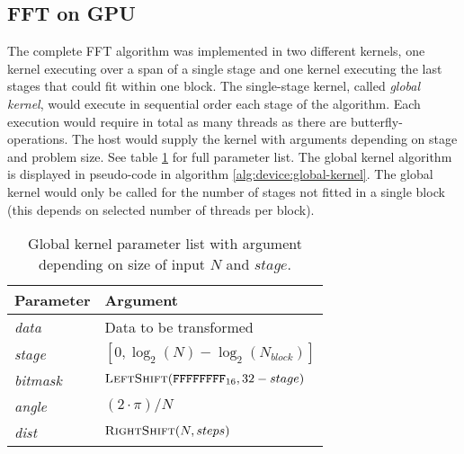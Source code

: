 \subsection{FFT on GPU}

The complete FFT algorithm was implemented in two different kernels, one kernel executing over a span of a single stage and one kernel executing the last stages that could fit within one block. The single-stage kernel, called \textit{global kernel}, would execute in sequential order each stage of the algorithm. Each execution would require in total as many threads as there are butterfly-operations. The host would supply the kernel with arguments depending on stage and problem size. See table \ref{tab:global-kernel} for full parameter list. The global kernel algorithm is displayed in pseudo-code in algorithm \ref{alg:device:global-kernel}. The global kernel would only be called for the number of stages not fitted in a single block (this depends on selected number of threads per block).

\begin{table}
	\centering
	\begin{tabular}{|l|l|}
		\hline
		Parameter & Argument \\ \hline
		\textit{data} & Data to be transformed \\ \hline
		\textit{stage} & $[0,\log_{2}(N) - \log_{2}(N_{block})]$ \\ \hline
		\textit{bitmask} & $\Call{LeftShift}{\texttt{FFFFFFFF}_{16}, 32 - stage}$ \\ \hline
		\textit{angle} & $(2 \cdot \pi)/N$ \\ \hline
		\textit{dist} & $\Call{RightShift}{N, steps}$ \\ \hline		
	\end{tabular}
	\caption{Global kernel parameter list with argument depending on size of input $N$ and $stage$.}
	\label{tab:global-kernel}
\end{table}


